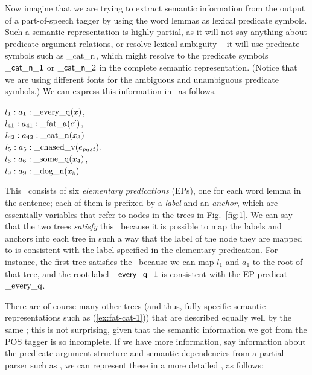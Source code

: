 Now imagine that we are trying to extract semantic information from
the output of a part-of-speech tagger by using the word lemmas as
lexical predicate symbols.  Such a semantic representation is highly
partial, as it will not say anything about predicate-argument
relations, or resolve lexical ambiguity -- it will use predicate
symbols such as $\mathrm{\_cat\_n}$, which might resolve to the
predicate symbols $\mathsf{\_cat\_n\_1}$ or $\mathsf{\_cat\_n\_2}$ in the
complete semantic representation.  (Notice that we are using different
fonts for the ambiguous and unambiguous predicate symbols.)  We can
express this information in \rmrs\ as follows.

\begin{examples}
\item \label{ex:cat-pos}
$l_1:a_1:\mathrm{\_every\_q}(x)$, \\
$l_{41}:a_{41}:\mathrm{\_fat\_a}(e')$,\\
$l_{42}:a_{42}:\mathrm{\_cat\_n}(x_3)$\\
$l_5:a_5:\mathrm{\_chased\_v}(e_{past})$, \\
$l_6:a_6:\mathrm{\_some\_q}(x_4)$, \\
$l_9:a_9:\mathrm{\_dog\_n}(x_5)$
\end{examples}

This \rmrs\ consists of six \emph{elementary predications} (EPs), one
for each word lemma in the sentence; each of them is prefixed by a
\emph{label} and an \emph{anchor}, which are essentially variables
that refer to nodes in the trees in Fig.~\ref{fig:1}.  We can say that
the two trees \emph{satisfy} this \rmrs\ because it is possible to map
the labels and anchors into each tree in such a way that the label of
the node they are mapped to is consistent with the label specified in
the elementary predication.  For instance, the first tree satisfies
the \rmrs\ because we can map $l_1$ and $a_1$ to the root of that
tree, and the root label $\mathsf{\_every\_q\_1}$ is consistent with the
EP predicat $\mathrm{\_every\_q}$.

There are of course many other trees (and thus, fully specific
semantic representations such as (\ref{ex:fat-cat-1})) that are
described equally well by the same \rmrs; this is not surprising,
given that the semantic information we got from the POS tagger is so
incomplete.  If we have more information, say information about the
predicate-argument structure and semantic dependencies from a partial
parser such as , we can represent these in a more
detailed \rmrs, as follows:

